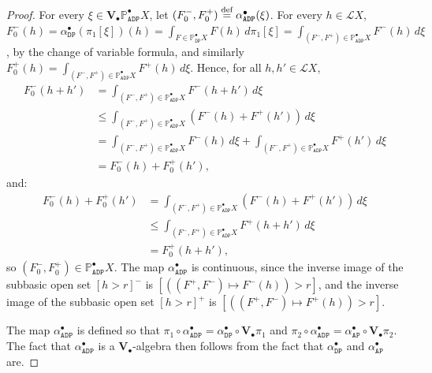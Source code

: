 \documentclass[preprint,12pt]{elsarticle}
\newcommand\eqdef{\mathrel{\buildrel \text{def}\over=}}
\newcommand\Lform{\mathcal L}
\newcommand\Pred{\mathbb{P}}
\newcommand\Angel{{\mathtt{A}}}
\newcommand\Demon{{\mathtt{D}}}
\newcommand\Nature{{\mathtt{P}}}
\newcommand\AN{{\Angel\Nature}}
\newcommand\DN{{\Demon\Nature}}
\newcommand\ADN{{\Angel\Demon\Nature}}
\newcommand\Val{{\mathbf V}}
\begin{document}
\begin{proof}
  For every $\xi \in \Val_\bullet {\Pred_\ADN^\bullet X}$, let
  $(F_0^-, F_0^+) \eqdef \alpha_\ADN^\bullet (\xi)$.  For every
  $h \in \Lform X$,
  $F_0^- (h) = \alpha_\DN^\bullet (\pi_1 [\xi]) (h) = \int_{F \in
    \Pred_\DN^\bullet X} F (h) \,d\pi_1 [\xi] = \int_{(F^-, F^+) \in
    \Pred_\ADN^\bullet X} F^- (h) \,d\xi$, by the change of variable
  formula, and similarly
  $F_0^+ (h) = \int_{(F^-, F^+) \in \Pred_\ADN^\bullet X} F^+ (h)
  \,d\xi$.  Hence, for all $h, h' \in \Lform X$,
  \begin{align*}
    F_0^- (h+h')
    & = \int_{(F^-, F^+) \in \Pred_\ADN^\bullet X} F^- (h+h') \,d\xi
    \\
    & \leq \int_{(F^-, F^+) \in \Pred_\ADN^\bullet X} (F^-
      (h)+F^+(h')) \,d\xi \\
    & = \int_{(F^-, F^+) \in \Pred_\ADN^\bullet X} F^- (h) \,d\xi
      + \int_{(F^-, F^+) \in \Pred_\ADN^\bullet X} F^+ (h') \,d\xi
    \\
    & = F_0^- (h) + F_0^+ (h'),
  \end{align*}
  and:
  \begin{align*}
    F_0^- (h) + F_0^+ (h')
    & = \int_{(F^-, F^+) \in \Pred_\ADN^\bullet X} (F^-
      (h)+F^+(h')) \,d\xi
    \\
    & \leq \int_{(F^-, F^+) \in \Pred_\ADN^\bullet X} F^+ (h+h')
      \,d\xi \\
    & = F_0^+ (h+h'),
  \end{align*}
  so $(F_0^-, F_0^+) \in \Pred_\ADN^\bullet X$.  The map
  $\alpha_\ADN^\bullet$ is continuous, since the inverse image of the
  subbasic open set $[h > r]^-$ is
  $[((F^+, F^-) \mapsto F^- (h)) > r]$, and the inverse image of the
  subbasic open set $[h > r]^+$ is
  $[((F^+, F^-) \mapsto F^+ (h)) > r]$.

  The map $\alpha_\ADN^\bullet$ is defined so that
  $\pi_1 \circ \alpha_\ADN^\bullet = \alpha_\DN^\bullet \circ
  \Val_\bullet {\pi_1}$ and
  $\pi_2 \circ \alpha_\ADN^\bullet = \alpha_\AN^\bullet \circ
  \Val_\bullet {\pi_2}$.  The fact that $\alpha_\ADN^\bullet$ is a
  $\Val_\bullet$-algebra then follows from the fact that
  $\alpha_\DN^\bullet$ and $\alpha_\AN^\bullet$ are.


\end{proof}
\end{document}
